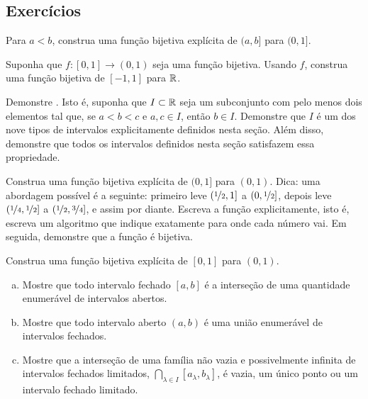 \subsection{Exercícios}

\begin{exercise}
Para $a < b$, construa uma função bijetiva explícita de $(a,b]$ para $(0,1]$.
\end{exercise}

\begin{exercise}
Suponha que $f \colon [0,1] \to (0,1)$ seja uma função bijetiva.
Usando $f$, construa uma
função bijetiva de $[-1,1]$ para ${\mathbb{R}}$.
\end{exercise}

\begin{exercise} \label{exercise:intervaldef}
Demonstre .
Isto é,
suponha que $I \subset {\mathbb{R}}$ seja um subconjunto com pelo menos dois elementos
tal que, se $a < b < c$ e $a, c \in I$, então $b \in I$.
Demonstre que $I$ é um dos nove tipos de intervalos explicitamente
definidos nesta seção.
Além disso, demonstre que todos os intervalos definidos nesta seção
satisfazem essa propriedade.
\end{exercise}

\begin{exercise}[Difícil]
Construa uma função bijetiva explícita de $(0,1]$ para $(0,1)$.
Dica: uma abordagem possível é a seguinte: primeiro leve $(\nicefrac{1}{2},1]$
a $(0,\nicefrac{1}{2}]$, depois leve
$(\nicefrac{1}{4},\nicefrac{1}{2}]$
a $(\nicefrac{1}{2},\nicefrac{3}{4}]$, e assim por diante.
Escreva a função explicitamente, isto é,
escreva um algoritmo que indique exatamente para onde cada número vai.
Em seguida, demonstre que a função é bijetiva.
\end{exercise}

\begin{exercise}[Difícil]
Construa uma função bijetiva explícita de $[0,1]$ para $(0,1)$.
\end{exercise}

\begin{exercise}
\leavevmode
\begin{enumerate}[a)]
\item
Mostre que todo intervalo fechado $[a,b]$ é a interseção
de uma quantidade enumerável de intervalos abertos.
\item
Mostre que todo intervalo aberto $(a,b)$
é uma união enumerável de intervalos fechados.
\item
Mostre que a interseção
de uma família não vazia e possivelmente infinita de intervalos fechados limitados,
$\bigcap\limits_{\lambda \in I} [a_\lambda,b_\lambda]$,
é vazia, um único ponto
ou um intervalo fechado limitado.
\end{enumerate}
\end{exercise}


